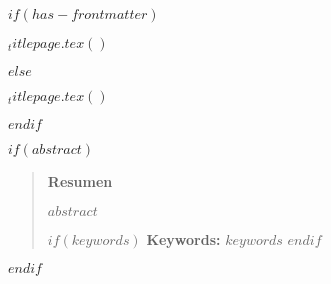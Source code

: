 $if(has-frontmatter)$
    \frontmatter
    \begin{titlepage}
        $_titlepage.tex()$
    \end{titlepage}
$else$
    \begin{titlepage}
        $_titlepage.tex()$
    \end{titlepage}
$endif$

$if(abstract)$
    \begin{abstract}
        \centerline{\textbf{\Large Resumen}}
        $abstract$
        
        $if(keywords)$
            \textbf{Keywords: } $keywords$
        $endif$
        
    \end{abstract}
$endif$

